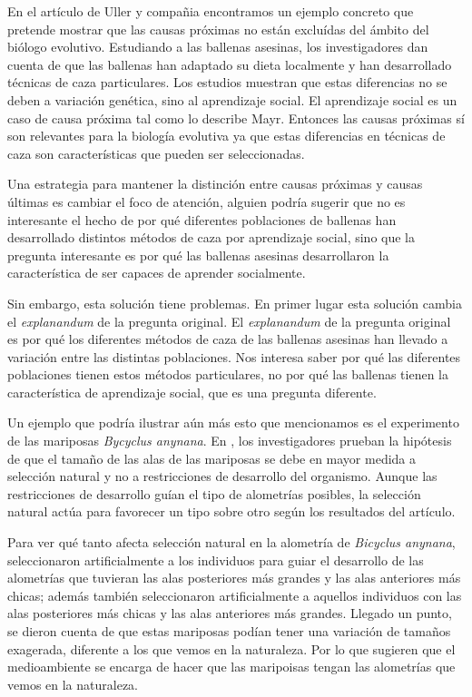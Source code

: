 En el artículo de Uller y compañia \citeyear{Uller2019} encontramos un ejemplo concreto que pretende mostrar que las causas próximas no están excluídas del ámbito del biólogo evolutivo. Estudiando a las ballenas asesinas, los investigadores dan cuenta de que las ballenas han adaptado su dieta localmente y han desarrollado técnicas de caza particulares. Los estudios muestran que estas diferencias no se deben a variación genética, sino al aprendizaje social. El aprendizaje social es un caso de causa próxima tal como lo describe Mayr. Entonces las causas próximas sí son relevantes para la biología evolutiva ya que estas diferencias en técnicas de caza son características que pueden ser seleccionadas.

Una estrategia para mantener la distinción entre causas próximas y causas últimas es cambiar el foco de atención, alguien podría sugerir que no es interesante el hecho de por qué diferentes poblaciones de ballenas han desarrollado distintos métodos de caza por aprendizaje social, sino que la pregunta interesante es por qué las ballenas asesinas desarrollaron la característica de ser capaces de aprender socialmente.

Sin embargo, esta solución tiene problemas. En primer lugar esta solución cambia el \emph{explanandum} de la pregunta original. El \emph{explanandum} de la pregunta original es por qué los diferentes métodos de caza de las ballenas asesinas han llevado a variación entre las distintas poblaciones. Nos interesa saber por qué las diferentes poblaciones tienen estos métodos particulares, no por qué las ballenas tienen la característica de aprendizaje social, que es una pregunta diferente.

Un ejemplo que podría ilustrar aún más esto que mencionamos es el experimento de las mariposas \textit{Bycyclus anynana}. En \cite{Frankino2007}, los investigadores prueban la hipótesis de que el tamaño de las alas de las mariposas se debe en mayor medida a selección natural y no a restricciones de desarrollo del organismo. Aunque las restricciones de desarrollo guían el tipo de alometrías posibles, la selección natural actúa para favorecer un tipo sobre otro según los resultados del artículo.

Para ver qué tanto afecta selección natural en la alometría de \emph{Bicyclus anynana}, seleccionaron artificialmente a los individuos para guiar el desarrollo de las alometrías que tuvieran las alas posteriores más grandes y las alas anteriores más chicas; además también seleccionaron artificialmente a aquellos individuos con las alas posteriores más chicas y las alas anteriores más grandes. Llegado un punto, se dieron cuenta de que estas mariposas podían tener una variación de tamaños exagerada, diferente a los que vemos en la naturaleza. Por lo que sugieren que el medioambiente se encarga de hacer que las maripoisas tengan las alometrías que vemos en la naturaleza.

